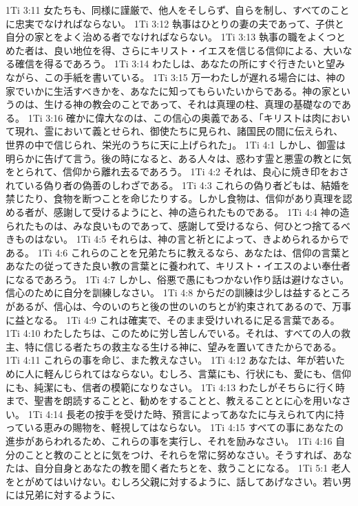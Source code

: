 1Ti 3:11  女たちも、同様に謹厳で、他人をそしらず、自らを制し、すべてのことに忠実でなければならない。
1Ti 3:12  執事はひとりの妻の夫であって、子供と自分の家とをよく治める者でなければならない。
1Ti 3:13  執事の職をよくつとめた者は、良い地位を得、さらにキリスト・イエスを信じる信仰による、大いなる確信を得るであろう。
1Ti 3:14  わたしは、あなたの所にすぐ行きたいと望みながら、この手紙を書いている。
1Ti 3:15  万一わたしが遅れる場合には、神の家でいかに生活すべきかを、あなたに知ってもらいたいからである。神の家というのは、生ける神の教会のことであって、それは真理の柱、真理の基礎なのである。
1Ti 3:16  確かに偉大なのは、この信心の奥義である、「キリストは肉において現れ、霊において義とせられ、御使たちに見られ、諸国民の間に伝えられ、世界の中で信じられ、栄光のうちに天に上げられた」。
1Ti 4:1  しかし、御霊は明らかに告げて言う。後の時になると、ある人々は、惑わす霊と悪霊の教とに気をとられて、信仰から離れ去るであろう。
1Ti 4:2  それは、良心に焼き印をおされている偽り者の偽善のしわざである。
1Ti 4:3  これらの偽り者どもは、結婚を禁じたり、食物を断つことを命じたりする。しかし食物は、信仰があり真理を認める者が、感謝して受けるようにと、神の造られたものである。
1Ti 4:4  神の造られたものは、みな良いものであって、感謝して受けるなら、何ひとつ捨てるべきものはない。
1Ti 4:5  それらは、神の言と祈とによって、きよめられるからである。
1Ti 4:6  これらのことを兄弟たちに教えるなら、あなたは、信仰の言葉とあなたの従ってきた良い教の言葉とに養われて、キリスト・イエスのよい奉仕者になるであろう。
1Ti 4:7  しかし、俗悪で愚にもつかない作り話は避けなさい。信心のために自分を訓練しなさい。
1Ti 4:8  からだの訓練は少しは益するところがあるが、信心は、今のいのちと後の世のいのちとが約束されてあるので、万事に益となる。
1Ti 4:9  これは確実で、そのまま受けいれるに足る言葉である。
1Ti 4:10  わたしたちは、このために労し苦しんでいる。それは、すべての人の救主、特に信じる者たちの救主なる生ける神に、望みを置いてきたからである。
1Ti 4:11  これらの事を命じ、また教えなさい。
1Ti 4:12  あなたは、年が若いために人に軽んじられてはならない。むしろ、言葉にも、行状にも、愛にも、信仰にも、純潔にも、信者の模範になりなさい。
1Ti 4:13  わたしがそちらに行く時まで、聖書を朗読することと、勧めをすることと、教えることとに心を用いなさい。
1Ti 4:14  長老の按手を受けた時、預言によってあなたに与えられて内に持っている恵みの賜物を、軽視してはならない。
1Ti 4:15  すべての事にあなたの進歩があらわれるため、これらの事を実行し、それを励みなさい。
1Ti 4:16  自分のことと教のこととに気をつけ、それらを常に努めなさい。そうすれば、あなたは、自分自身とあなたの教を聞く者たちとを、救うことになる。
1Ti 5:1  老人をとがめてはいけない。むしろ父親に対するように、話してあげなさい。若い男には兄弟に対するように、
